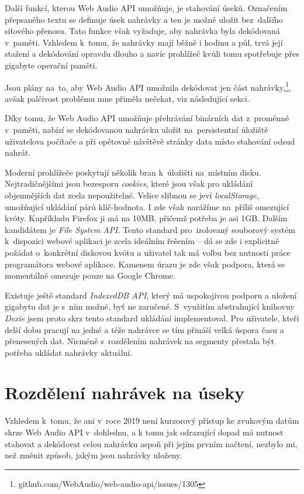 Další funkcí, kterou Web Audio API umožňuje, je stahování úseků. Označením
přepsaného textu se definuje úsek nahrávky a ten je možné uložit bez~dalšího
síťového přenosu. Tato funkce však vyžaduje, aby nahrávka byla dekódovaná
v~paměti. Vzhledem k~tomu, že nahrávky mají běžně i hodinu a půl, trvá její
stažení a dekódování opravdu dlouho a navíc prohlížeč kvůli tomu spotřebuje přes
gigabyte operační paměti.

Jsou plány na~to, aby Web Audio API umožnila dekódovat jen část
nahrávky,\footnote{github.com/WebAudio/web-audio-api/issues/1305}, avšak
palčivost problému mne přiměla nečekat, viz následující sekci.

Díky tomu, že Web Audio API umožňuje přehrávání binárních dat z~proměnné
v~paměti, nabízí se dekódovanou nahrávku uložit na~persistentní úložiště
uživatelova počítače a při opětovné návštěvě stránky data místo stahování odsud
nahrát.

Moderní prohlížeče poskytují několik bran k~úložišti na~místním disku.
Nejtradičnějšími jsou bezesporu \textit{cookies}, které jsou však pro ukládání
objemnějších dat zcela nepoužitelné. Velice slibnou se jeví
\textit{localStorage}, umožňující ukládání párů klíč-hodnota. I zde však
narážíme na~příliš omezující kvóty. Kupříkladu Firefox ji má na 10MB, přičemž
potřeba je asi 1GB. Dalším kandidátem je \textit{File System API}. Tento
standard pro~izolovaný souborový systém k~dispozici webové aplikaci je zcela
ideálním řešením -- dá se zde i explicitně požádat o~konkrétní diskovou kvótu a
uživatel tak má volbu bez nutnosti práce programátora webové aplikace. Kamenem
úrazu je zde však podpora, která se momentálně omezuje pouze na Google Chrome.

Existuje ještě standard \textit{IndexedDB API}, který má uspokojivou
podporu a uložení gigabytu dat je s~ním možné, byť ne zaručené. S~využitím
abstrahující knihovny \textit{Dexie} jsem proto skrz tento standard ukládání
implementoval. Pro uživatele, kteří delší dobu pracují na jedné a téže nahrávce
se tím přináší velká úspora času a přenesených dat. Nicméně s~rozdělením
nahrávek na segmenty přestala být potřeba ukládat nahrávky aktuální.

\section{Rozdělení nahrávek na úseky}

Vzhledem k~tomu, že ani v~roce 2019 není kurzorový přístup ke zvukovým datům
skrze Web Audio API v~dohlednu, a k tomu jak odrazující dopad má nutnost
stahovat a dekódovat celou nahrávku aspoň při jejím prvním načtení, nezbylo mi,
než změnit způsob, jakým jsou nahrávky uloženy.

